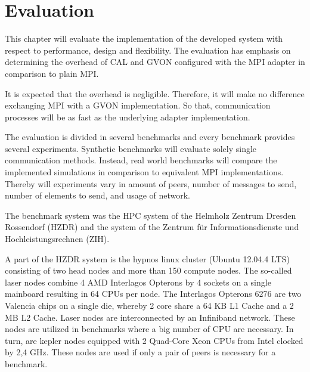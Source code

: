 \chapter{Evaluation}
\label{sec:evaluation}


This chapter will evaluate the implementation of the developed
system with respect to performance, design and flexibility.  The
evaluation has emphasis on determining the overhead of CAL and GVON
configured with the MPI adapter in comparison to plain MPI.

It is expected that the overhead is negligible. Therefore, it will
make no difference exchanging MPI with a GVON implementation. So that,
communication processes will be as fast as the underlying adapter
implementation.

The evaluation is divided in several benchmarks and every benchmark
provides several experiments. Synthetic benchmarks will evaluate
solely single communication methods. Instead, real world benchmarks
will compare the implemented simulations in comparison to equivalent
MPI implementations. Thereby will experiments vary in amount of peers,
number of messages to send, number of elements to send, and usage of
network.

The benchmark system was the HPC system of the Helmholz
Zentrum Dresden Rossendorf (HZDR)\cite{ref:hzdr_cluster} and the
system of the Zentrum für Informationsdienste und Hochleistungsrechnen
(ZIH).

A part of the HZDR system is the hypnos linux cluster (Ubuntu 12.04.4
LTS) consisting of two head nodes and more than 150 compute nodes.
The so-called laser nodes combine 4 AMD Interlagos Opterons by 4
sockets on a single mainboard resulting in 64 CPUs per node.  The
Interlagos Opterons 6276 are two Valencia chips on a single die,
whereby 2 core share a 64 KB L1 Cache and a 2 MB L2 Cache. Laser nodes
are interconnected by an Infiniband network. These nodes are utilized
in benchmarks where a big number of CPU are necessary.  In turn, are
kepler nodes equipped with 2 Quad-Core Xeon CPUs from Intel clocked by
2,4 GHz. These nodes are used if only a pair of peers is necessary for
a benchmark.

